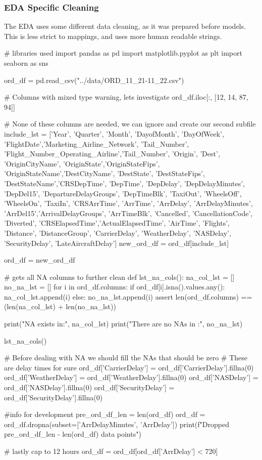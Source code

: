 \documentclass[a4paper,12pt]{article}
\begin{document}
\subsubsection{EDA Specific Cleaning} \label{EDA Specific Cleaning}
The EDA uses some different data cleaning, as it was prepared before models. This is less strict to mappings, and uses more human readable strings.
\begin{python}

# libraries used
import pandas as pd
import matplotlib.pyplot as plt
import seaborn as sns

ord_df = pd.read_csv("../data/ORD_11_21-11_22.csv")

# Columns with mixed type warning, lets investigate
ord_df.iloc[:, [12, 14, 87, 94]]

# None of these columns are needed, we can ignore and create our second subfile
include_lst = ['Year', 'Quarter', 'Month', 'DayofMonth', 'DayOfWeek',
'FlightDate','Marketing_Airline_Network', 'Tail_Number',
'Flight_Number_Operating_Airline','Tail_Number', 'Origin', 'Dest',
'OriginCityName', 'OriginState','OriginStateFips',
'OriginStateName','DestCityName', 'DestState', 'DestStateFips',
'DestStateName','CRSDepTime', 'DepTime', 'DepDelay',
'DepDelayMinutes', 'DepDel15', 'DepartureDelayGroups', 'DepTimeBlk',
'TaxiOut', 'WheelsOff', 'WheelsOn',
'TaxiIn', 'CRSArrTime', 'ArrTime', 'ArrDelay', 'ArrDelayMinutes',
'ArrDel15','ArrivalDelayGroups', 'ArrTimeBlk', 'Cancelled',
'CancellationCode', 'Diverted', 'CRSElapsedTime','ActualElapsedTime',
'AirTime', 'Flights', 'Distance', 'DistanceGroup',
'CarrierDelay', 'WeatherDelay', 'NASDelay', 'SecurityDelay',
'LateAircraftDelay']
new_ord_df = ord_df[include_lst]

ord_df = new_ord_df

# gets all NA columns to further clean
def lst_na_cols():
    na_col_lst = []
    no_na_lst = []
    for i in ord_df.columns:
        if ord_df[i].isna().values.any():
            na_col_lst.append(i)
        else:
            no_na_lst.append(i)
    assert len(ord_df.columns) == (len(na_col_lst) + len(no_na_lst))

    print("NA exists in:", na_col_lst)
    print("There are no NAs in :", no_na_lst)

lst_na_cols()

# Before dealing with NA we should fill the NAs that should be zero
# These are delay times for sure
ord_df['CarrierDelay'] = ord_df['CarrierDelay'].fillna(0)
ord_df['WeatherDelay'] = ord_df['WeatherDelay'].fillna(0)
ord_df['NASDelay'] = ord_df['NASDelay'].fillna(0)
ord_df['SecurityDelay'] = ord_df['SecurityDelay'].fillna(0)

#info for development
pre_ord_df_len = len(ord_df)
ord_df = ord_df.dropna(subset=['ArrDelayMinutes', 'ArrDelay'])
print(f"Dropped {pre_ord_df_len - len(ord_df)} data points")

# lastly cap to 12 hours
ord_df = ord_df[ord_df['ArrDelay'] < 720]

\end{python}
\end{document}
